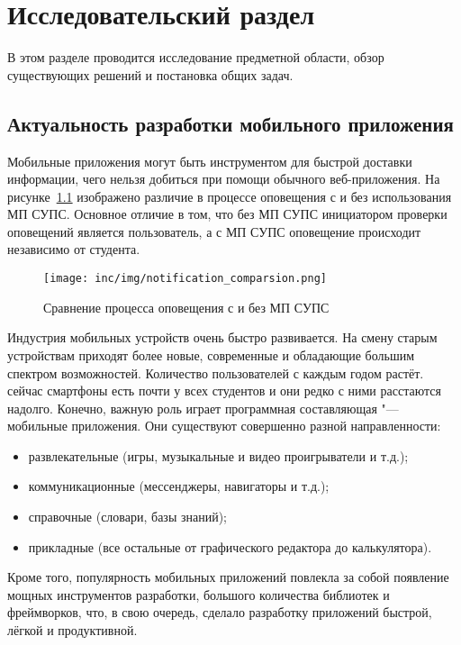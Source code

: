 \chapter{Исследовательский раздел}
\label{ch:research}
В этом разделе проводится исследование предметной области, обзор существующих решений и постановка общих задач.

\section{Актуальность разработки мобильного приложения}
\label{sec:whyApp}

Мобильные приложения могут быть инструментом для быстрой доставки информации, чего нельзя добиться при помощи обычного веб-приложения.
На рисунке~\ref{fig:notificationComparsion} изображено различие в процессе оповещения с и без использования МП СУПС.
Основное отличие в том, что без МП СУПС инициатором проверки оповещений является пользователь, а с МП СУПС оповещение происходит независимо от студента.

\begin{figure}[ht]
  \centering
  \texttt{[image: inc/img/notification\_comparsion.png]}
  \caption{Сравнение процесса оповещения с и без МП СУПС}
  \label{fig:notificationComparsion}
\end{figure}

Индустрия мобильных устройств очень быстро развивается.
На смену старым устройствам приходят более новые, современные и обладающие большим спектром возможностей.
Количество пользователей с каждым годом растёт.
сейчас смартфоны есть почти у всех студентов и они редко с ними расстаются надолго.
Конечно, важную роль играет программная составляющая "--- мобильные приложения.
Они существуют совершенно разной направленности:
\begin{itemize}
  \item развлекательные (игры, музыкальные и видео проигрыватели и т.д.);
  \item коммуникационные (мессенджеры, навигаторы и т.д.);
  \item справочные (словари, базы знаний);
  \item прикладные (все остальные от графического редактора до калькулятора).
\end{itemize}

Кроме того, популярность мобильных приложений повлекла за собой появление мощных инструментов разработки, большого количества библиотек и фреймворков, что, в свою очередь, сделало разработку приложений быстрой, лёгкой и продуктивной.


